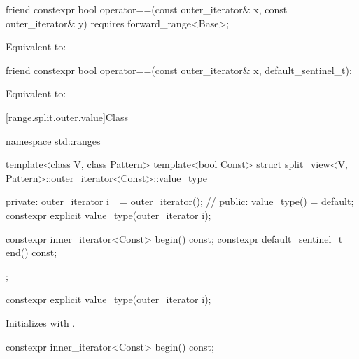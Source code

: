 %
\begin{itemdecl}
friend constexpr bool operator==(const outer_iterator& x, const outer_iterator& y)
  requires forward_range<Base>;
\end{itemdecl}

\begin{itemdescr}
\pnum
\effects
Equivalent to: 
\end{itemdescr}

%
\begin{itemdecl}
friend constexpr bool operator==(const outer_iterator& x, default_sentinel_t);
\end{itemdecl}

\begin{itemdescr}
\pnum
\effects
Equivalent to: 
\end{itemdescr}

[range.split.outer.value]{Class }

%
\begin{codeblock}
namespace std::ranges {
  template<class V, class Pattern>
  template<bool Const>
  struct split_view<V, Pattern>::outer_iterator<Const>::value_type {
  private:
    outer_iterator i_ = outer_iterator();               // \expos
  public:
    value_type() = default;
    constexpr explicit value_type(outer_iterator i);

    constexpr inner_iterator<Const> begin() const;
    constexpr default_sentinel_t end() const;
  };
}
\end{codeblock}

%
\begin{itemdecl}
constexpr explicit value_type(outer_iterator i);
\end{itemdecl}

\begin{itemdescr}
\pnum
\effects
Initializes  with .
\end{itemdescr}

%
\begin{itemdecl}
constexpr inner_iterator<Const> begin() const;
\end{itemdecl}


